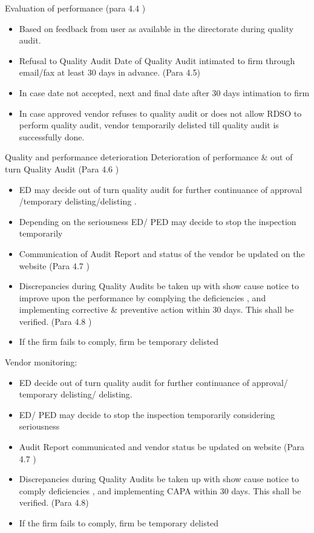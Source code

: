 \documentclass[
  10pt,
  ignorenonframetext,
  aspectratio=43,
]{beamer}
\providecommand{\tightlist}{%
  \setlength{\itemsep}{0pt}\setlength{\parskip}{0pt}}
\begin{document}
\begin{frame}{Evaluation of performance (para 4.4 )}
\protect\hypertarget{evaluation-of-performance-para-4.4}{}
\begin{itemize}
\tightlist
\item
  Based on feedback from user as available in the directorate during
  quality audit.
\item
  Refusal to Quality Audit Date of Quality Audit intimated to firm
  through email/fax at least 30 days in advance. (Para 4.5)
\item
  In case date not accepted, next and final date after 30 days
  intimation to firm
\item
  In case approved vendor refuses to quality audit or does not allow
  RDSO to perform quality audit, vendor temporarily delisted till
  quality audit is successfully done.
\end{itemize}
\end{frame}

\begin{frame}{Quality and performance deterioration}
\protect\hypertarget{quality-and-performance-deterioration}{}
Deterioration of performance \& out of turn Quality Audit (Para 4.6 )

\begin{itemize}
\item
  ED may decide out of turn quality audit for further continuance of
  approval /temporary delisting/delisting .
\item
  Depending on the seriousness ED/ PED may decide to stop the inspection
  temporarily
\item
  Communication of Audit Report and status of the vendor be updated on
  the website (Para 4.7 )
\item
  Discrepancies during Quality Audits be taken up with show cause notice
  to improve upon the performance by complying the deficiencies , and
  implementing corrective \& preventive action within 30 days. This
  shall be verified. (Para 4.8 )
\item
  If the firm fails to comply, firm be temporary delisted
\end{itemize}
\end{frame}

\begin{frame}{Vendor monitoring:}
\protect\hypertarget{vendor-monitoring}{}
\begin{itemize}
\item
  ED decide out of turn quality audit for further continuance of
  approval/ temporary delisting/ delisting.
\item
  ED/ PED may decide to stop the inspection temporarily considering
  seriousness
\item
  Audit Report communicated and vendor status be updated on website
  (Para 4.7 )
\item
  Discrepancies during Quality Audits be taken up with show cause notice
  to comply deficiencies , and implementing CAPA within 30 days. This
  shall be verified. (Para 4.8)
\item
  If the firm fails to comply, firm be temporary delisted
\end{itemize}
\end{frame}
\end{document}
